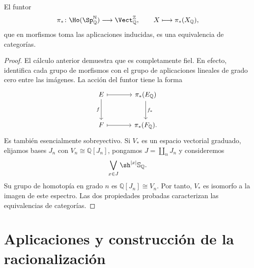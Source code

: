\begin{teo}\label{teo:c22-clasificacion-racional}
El funtor
\[
\pi_*\colon\Ho(\Sp_{\mathbb Q}^{\mathbb N})
\longrightarrow\Vect_{\mathbb Q}^{\mathbb Z},
\qquad X\longmapsto\pi_*(X_{\mathbb Q}),
\]
que en morfismos toma las aplicaciones inducidas, es una equivalencia de categorías.
\end{teo}
\begin{proof}
El cálculo anterior demuestra que es completamente fiel. En efecto, identifica cada grupo de morfismos con el grupo de aplicaciones lineales de grado cero entre las imágenes. La acción del funtor tiene la forma
\[
\begin{tikzcd}[column sep=large,row sep=large]
E\arrow[d,"f"']\arrow[r,mapsto]&\pi_*(E_{\mathbb Q})\arrow[d,"f_*"]\\
F\arrow[r,mapsto]&\pi_*(F_{\mathbb Q}).
\end{tikzcd}
\]
Es también esencialmente sobreyectivo. Si $V_*$ es un espacio vectorial graduado, elijamos bases $J_n$ con $V_n\cong\mathbb Q[J_n]$, pongamos $J=\coprod_nJ_n$ y consideremos
\[
\bigvee_{x\in J}\sh^{|x|}\mathbb S_{\mathbb Q}.
\]
Su grupo de homotopía en grado $n$ es $\mathbb Q[J_n]\cong V_n$. Por tanto, $V_*$ es isomorfo a la imagen de este espectro. Las dos propiedades probadas caracterizan las equivalencias de categorías.
\end{proof}

\section{Aplicaciones y construcción de la racionalización}

